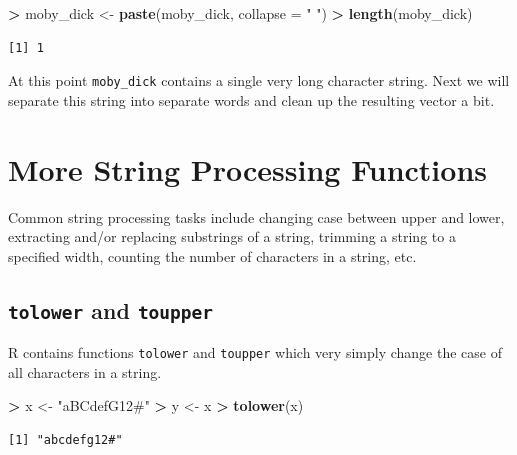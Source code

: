 \documentclass[]{krantz}
\makeatletter
\newenvironment{Shaded}{\begin{snugshade}}{\end{snugshade}}
\newcommand{\DataTypeTok}[1]{\textcolor[rgb]{0.27,0.27,0.27}{#1}}
\newcommand{\KeywordTok}[1]{\textcolor[rgb]{0.27,0.27,0.27}{\textbf{#1}}}
\newcommand{\NormalTok}[1]{#1}
\newcommand{\OperatorTok}[1]{\textcolor[rgb]{0.43,0.43,0.43}{\textbf{#1}}}
\newcommand{\StringTok}[1]{\textcolor[rgb]{0.5,0.5,0.5}{#1}}
\newenvironment{kframe}{%
\medskip{}
\setlength{\fboxsep}{.8em}
 \def\at@end@of@kframe{}%
 \ifinner\ifhmode%
  \def\at@end@of@kframe{\end{minipage}}%
  \begin{minipage}{\columnwidth}%
 \fi\fi%
 \def\FrameCommand##1{\hskip\@totalleftmargin \hskip-\fboxsep
 \colorbox{shadecolor}{##1}\hskip-\fboxsep
     \hskip-\linewidth \hskip-\@totalleftmargin \hskip\columnwidth}%
 \MakeFramed {\advance\hsize-\width
   \@totalleftmargin\z@ \linewidth\hsize
   \@setminipage}}%
 {\par\unskip\endMakeFramed%
 \at@end@of@kframe}
\renewenvironment{Shaded}{\begin{kframe}}{\end{kframe}}
\makeatother
\begin{document}
\begin{Shaded}
\begin{Highlighting}[]
\OperatorTok{>}\StringTok{ }\NormalTok{moby_dick <-}\StringTok{ }\KeywordTok{paste}\NormalTok{(moby_dick, }\DataTypeTok{collapse =} \StringTok{" "}\NormalTok{)}
\OperatorTok{>}\StringTok{ }\KeywordTok{length}\NormalTok{(moby_dick)}
\end{Highlighting}
\end{Shaded}

\begin{verbatim}
[1] 1
\end{verbatim}

At this point \texttt{moby\_dick} contains a single very long character string. Next we will separate this string into separate words and clean up the resulting vector a bit.

\hypertarget{more-string-processing-functions}{%
\section{More String Processing Functions}\label{more-string-processing-functions}}

Common string processing tasks include changing case between upper and lower, extracting and/or replacing substrings of a string, trimming a string to a specified width, counting the number of characters in a string, etc.

\hypertarget{tolower-and-toupper}{%
\subsection{\texorpdfstring{\texttt{tolower} and \texttt{toupper}}{tolower and toupper}}\label{tolower-and-toupper}}

R contains functions \texttt{tolower} and \texttt{toupper} which very simply change the case of all characters in a string.

\begin{Shaded}
\begin{Highlighting}[]
\OperatorTok{>}\StringTok{ }\NormalTok{x <-}\StringTok{ "aBCdefG12#"}
\OperatorTok{>}\StringTok{ }\NormalTok{y <-}\StringTok{ }\NormalTok{x}
\OperatorTok{>}\StringTok{ }\KeywordTok{tolower}\NormalTok{(x)}
\end{Highlighting}
\end{Shaded}

\begin{verbatim}
[1] "abcdefg12#"
\end{verbatim}
\end{document}
